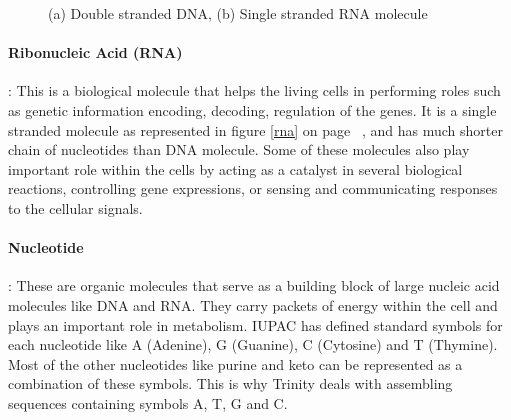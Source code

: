 \label{key}\documentclass[plainarticle, english ,zihtitle,final,hyperref,utf8]{zihpub}
\begin{document}
\begin{figure}[h]
\center
{}
\hspace{50pt}
\caption{(a) Double stranded DNA, (b) Single stranded RNA molecule}
\end{figure}
\paragraph{Ribonucleic Acid (RNA)}: 
This is a biological molecule that helps the living cells in performing roles such as genetic information encoding, decoding, regulation of the genes. It is a single stranded molecule as represented in figure \ref{rna} on page ~\pageref{rna}, and has much shorter chain of nucleotides than DNA molecule. Some of these molecules also play important role within the cells by acting as a catalyst in several biological reactions, controlling gene expressions, or sensing and communicating responses to the cellular signals. 
\paragraph{Nucleotide}: These are organic molecules that serve as a building block of large nucleic acid molecules like DNA and RNA. They carry packets of energy within the cell and plays an important role in metabolism. IUPAC has defined standard symbols for each nucleotide like A (Adenine), G (Guanine), C (Cytosine) and T (Thymine). Most of the other nucleotides like purine and keto can be represented as a combination of these symbols. This is why Trinity deals with assembling sequences containing symbols A, T, G and C.
\end{document}
